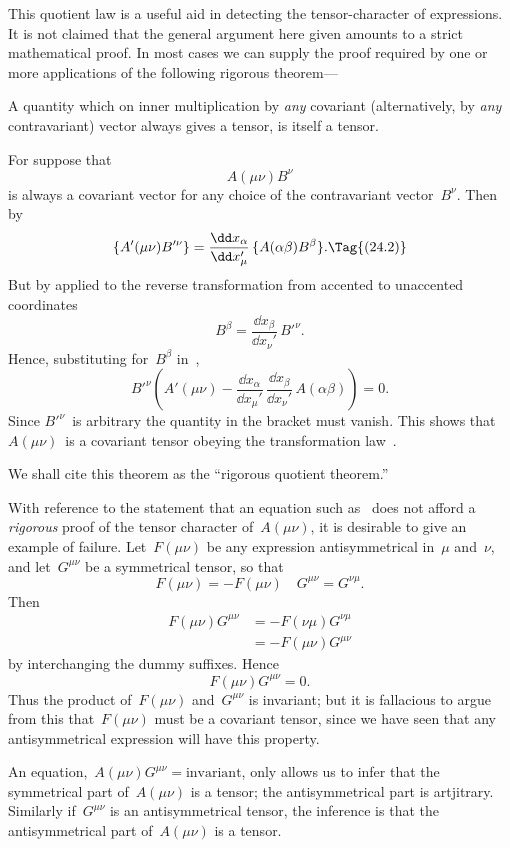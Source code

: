 \documentclass[12pt]{book}
\begin{document}
This quotient law is a useful aid in detecting the tensor-character of
%
expressions. It is not claimed that the general argument here given amounts
to a strict mathematical proof. In most cases we can supply the proof required
by one or more applications of the following rigorous theorem---

A quantity which on inner multiplication by \emph{any} covariant (alternatively,
by \emph{any} contravariant) vector always gives a tensor, is itself a tensor.

For suppose that
\[
A(\mu\nu) B^{\nu}
\]
is always a covariant vector for any choice of the contravariant vector~$B^{\nu}$.
Then by~
\[
\{A'(\mu\nu) B'^{\nu}\}
  = \frac{\dd x_{\alpha}}{\dd x_{\mu}'}\, \{A(\alpha\beta) B^{\beta}\}.
\Tag{(24.2)}
\]
But by  applied to the reverse transformation from accented to unaccented
coordinates
\[
B^{\beta} = \frac{\dd x_{\beta}}{\dd x_{\nu}'}\, B'^{\nu}.
\]
Hence, substituting for~$B^{\beta}$ in~,
\[
B'^{\nu} \left(A'(\mu\nu) - \frac{\dd x_{\alpha}}{\dd x_{\mu}'}\, \frac{\dd x_{\beta}}{\dd x_{\nu}'}\, A(\alpha\beta)\right) = 0.
\]
Since $B'^{\nu}$~is arbitrary the quantity in the bracket must vanish. This shows
that $A(\mu\nu)$~is a covariant tensor obeying the transformation law~.

We shall cite this theorem as the ``rigorous quotient theorem.''

With reference to the statement that an equation such as~ does not afford a \emph{rigorous} proof of
the tensor character of~$A(\mu\nu)$, it is desirable to give an example of failure.
Let~$F(\mu\nu)$ be any expression antisymmetrical in~$\mu$ and~$\nu$, and let~$G^{\mu\nu}$ be a symmetrical tensor,
so that
\[
F(\mu\nu) = -F(\mu\nu) \quad G^{\mu\nu} = G^{\nu\mu}.
\]
Then
\begin{align*}
F(\mu\nu)G^{\mu\nu} & = - F(\nu\mu)G^{\nu\mu}\\
                    & = - F(\mu\nu)G^{\mu\nu}
\end{align*}
by interchanging the dummy suffixes. Hence
\[
F(\mu\nu)G^{\mu\nu} = 0.
\]
Thus the product of~$F(\mu\nu)$ and~$G^{\mu\nu}$ is invariant; but it is fallacious to argue from this
that~$F(\mu\nu)$ must be a covariant tensor, since we have seen that any antisymmetrical expression will have
this property.

An equation,~$A(\mu\nu)G^{\mu\nu} = \text{invariant}$, only allows us to infer that the
symmetrical part of~$A(\mu\nu)$ is a tensor; the antisymmetrical part is artjitrary.
Similarly if~$G^{\mu\nu}$ is an antisymmetrical tensor, the inference is that the antisymmetrical part
of~$A(\mu\nu)$ is a tensor.
\end{document}
